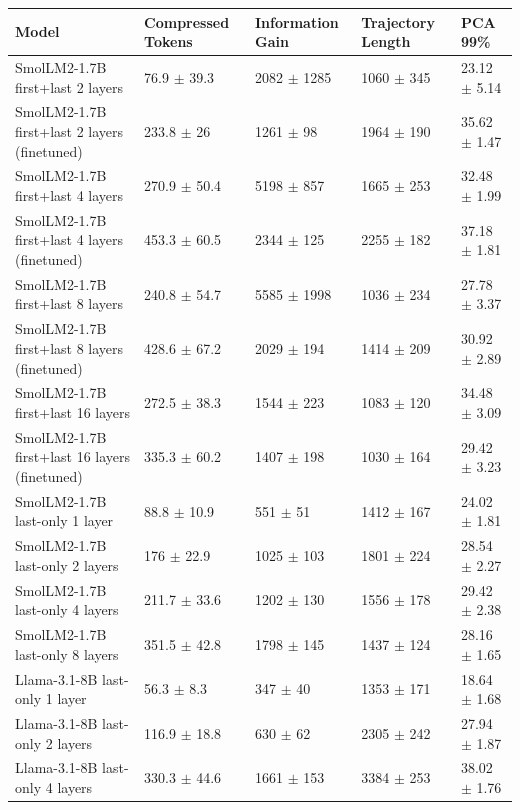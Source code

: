 \begin{tabular}{lllll}
\toprule
 Model                                         & Compressed Tokens         & Information Gain         & Trajectory Length       & PCA 99\%                   \\
\midrule
 SmolLM2-1.7B first+last 2 layers              & 76.9 {\small $\pm$ 39.3}  & 2082 {\small $\pm$ 1285} & 1060 {\small $\pm$ 345} & 23.12 {\small $\pm$ 5.14} \\
 SmolLM2-1.7B first+last 2 layers (finetuned)  & 233.8 {\small $\pm$ 26}   & 1261 {\small $\pm$ 98}   & 1964 {\small $\pm$ 190} & 35.62 {\small $\pm$ 1.47} \\
 SmolLM2-1.7B first+last 4 layers              & 270.9 {\small $\pm$ 50.4} & 5198 {\small $\pm$ 857}  & 1665 {\small $\pm$ 253} & 32.48 {\small $\pm$ 1.99} \\
 SmolLM2-1.7B first+last 4 layers (finetuned)  & 453.3 {\small $\pm$ 60.5} & 2344 {\small $\pm$ 125}  & 2255 {\small $\pm$ 182} & 37.18 {\small $\pm$ 1.81} \\
 SmolLM2-1.7B first+last 8 layers              & 240.8 {\small $\pm$ 54.7} & 5585 {\small $\pm$ 1998} & 1036 {\small $\pm$ 234} & 27.78 {\small $\pm$ 3.37} \\
 SmolLM2-1.7B first+last 8 layers (finetuned)  & 428.6 {\small $\pm$ 67.2} & 2029 {\small $\pm$ 194}  & 1414 {\small $\pm$ 209} & 30.92 {\small $\pm$ 2.89} \\
 SmolLM2-1.7B first+last 16 layers             & 272.5 {\small $\pm$ 38.3} & 1544 {\small $\pm$ 223}  & 1083 {\small $\pm$ 120} & 34.48 {\small $\pm$ 3.09} \\
 SmolLM2-1.7B first+last 16 layers (finetuned) & 335.3 {\small $\pm$ 60.2} & 1407 {\small $\pm$ 198}  & 1030 {\small $\pm$ 164} & 29.42 {\small $\pm$ 3.23} \\
 \midrule
 SmolLM2-1.7B last-only 1 layer                & 88.8 {\small $\pm$ 10.9}  & 551 {\small $\pm$ 51}    & 1412 {\small $\pm$ 167} & 24.02 {\small $\pm$ 1.81} \\
 SmolLM2-1.7B last-only 2 layers               & 176 {\small $\pm$ 22.9}   & 1025 {\small $\pm$ 103}  & 1801 {\small $\pm$ 224} & 28.54 {\small $\pm$ 2.27} \\
 SmolLM2-1.7B last-only 4 layers               & 211.7 {\small $\pm$ 33.6} & 1202 {\small $\pm$ 130}  & 1556 {\small $\pm$ 178} & 29.42 {\small $\pm$ 2.38} \\
 SmolLM2-1.7B last-only 8 layers               & 351.5 {\small $\pm$ 42.8} & 1798 {\small $\pm$ 145}  & 1437 {\small $\pm$ 124} & 28.16 {\small $\pm$ 1.65} \\
 \midrule
 Llama-3.1-8B last-only 1 layer                & 56.3 {\small $\pm$ 8.3}   & 347 {\small $\pm$ 40}    & 1353 {\small $\pm$ 171} & 18.64 {\small $\pm$ 1.68} \\
 Llama-3.1-8B last-only 2 layers               & 116.9 {\small $\pm$ 18.8} & 630 {\small $\pm$ 62}    & 2305 {\small $\pm$ 242} & 27.94 {\small $\pm$ 1.87} \\
 Llama-3.1-8B last-only 4 layers               & 330.3 {\small $\pm$ 44.6} & 1661 {\small $\pm$ 153}  & 3384 {\small $\pm$ 253} & 38.02 {\small $\pm$ 1.76} \\
\bottomrule
\end{tabular}
